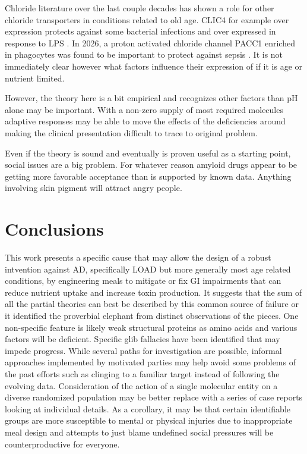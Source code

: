 Chloride literature over the last couple decades has
shown a role for other chloride transporters in 
conditions related to old age. CLIC4 for example
over expression protects against some bacterial 
infections 
and over expressed in response to LPS
\cite{He_Ma_Chou_Role_CLIC4_2011}.
In 2026, a proton activated chloride channel PACC1
enriched in phagocytes 
was found to be important to protect against sepsis
\cite{PMC13079969}.
It is not immediately clear however what factors influence
their expression of if it is age or nutrient limited.


However, the theory here is a bit empirical and recognizes other
factors than pH alone may be important.  With a non-zero supply
of most required molecules adaptive responses may be able
to move the effects of the deficiencies around making the
clinical presentation difficult to trace to original problem.

Even if the theory is sound and eventually is proven useful
as a starting point, social issues are a big problem.
For whatever reason amyloid drugs appear to be getting  more
favorable acceptance than is supported by known data.
Anything involving skin pigment will attract angry people.

\section{Conclusions}
This work  presents a specific cause that may allow
the design of a robust intvention against AD,
specifically LOAD but more generally most age related conditions,
by engineering meals to mitigate or fix GI impairments that
can reduce nutrient uptake and increase toxin production.
It suggests that the sum of all the partial theories can best
be described by this common source of failure or it identified
the proverbial elephant from distinct observations of the pieces.
One non-specific feature is likely weak structural proteins
as amino acids and various factors will be deficient.
Specific glib fallacies have been identified that may impede
progress. 
While several paths for investigation are possible, informal
approaches implemented by motivated parties may help avoid some problems of the
past efforts such as clinging to a familiar target instead of following
the evolving data. 
Consideration of the action
of a single molecular entity on a diverse randomized population
may be better replace with  a series of case reports looking at individual
details.  As a corollary, it may be that certain identifiable
groups are more susceptible to mental or physical injuries due to
inappropriate meal design and attempts to just blame undefined 
social pressures will be counterproductive for everyone.


